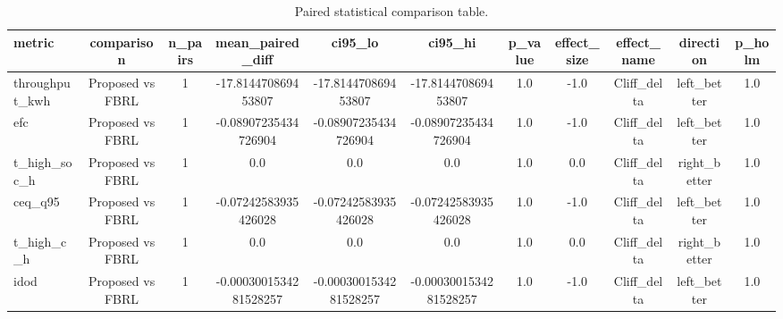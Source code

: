 \begin{table}[t]
\centering
\caption{Paired statistical comparison table.}
\label{tab:stats_auto}
\begin{tabular}{lcccccccccc}
\toprule
metric & comparison & n\_pairs & mean\_paired\_diff & ci95\_lo & ci95\_hi & p\_value & effect\_size & effect\_name & direction & p\_holm \\
\midrule
throughput\_kwh & Proposed vs FBRL & 1 & -17.814470869453807 & -17.814470869453807 & -17.814470869453807 & 1.0 & -1.0 & Cliff\_delta & left\_better & 1.0 \\
efc & Proposed vs FBRL & 1 & -0.08907235434726904 & -0.08907235434726904 & -0.08907235434726904 & 1.0 & -1.0 & Cliff\_delta & left\_better & 1.0 \\
t\_high\_soc\_h & Proposed vs FBRL & 1 & 0.0 & 0.0 & 0.0 & 1.0 & 0.0 & Cliff\_delta & right\_better & 1.0 \\
ceq\_q95 & Proposed vs FBRL & 1 & -0.07242583935426028 & -0.07242583935426028 & -0.07242583935426028 & 1.0 & -1.0 & Cliff\_delta & left\_better & 1.0 \\
t\_high\_c\_h & Proposed vs FBRL & 1 & 0.0 & 0.0 & 0.0 & 1.0 & 0.0 & Cliff\_delta & right\_better & 1.0 \\
idod & Proposed vs FBRL & 1 & -0.0003001534281528257 & -0.0003001534281528257 & -0.0003001534281528257 & 1.0 & -1.0 & Cliff\_delta & left\_better & 1.0 \\
\bottomrule
\end{tabular}
\end{table}